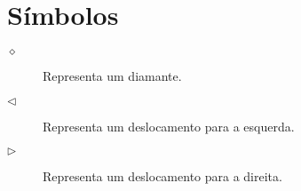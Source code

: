 \chapter*{Símbolos}

\begin{description}
    \item[$\diamond$] Representa um diamante.
    \item[$\lhd$] Representa um deslocamento para a esquerda.
    \item[$\rhd$] Representa um deslocamento para a direita.
\end{description}
